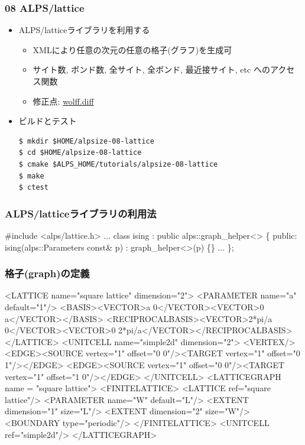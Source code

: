 \begin{frame}[fragile]
  \frametitle{08 ALPS/lattice}
  \begin{itemize}
    \item ALPS/latticeライブラリを利用する
      \begin{itemize}
        \item XMLにより任意の次元の任意の格子(グラフ)を生成可
        \item サイト数, ボンド数, 全サイト, 全ボンド, 最近接サイト, etc へのアクセス関数
        \item 修正点: \href{https://github.com/cmsi/alps-tutorial/blob/develop/alpsize/08-wolff.diff}{wolff.diff}
      \end{itemize}
    \item ビルドとテスト
\begin{lstlisting}
$ mkdir $HOME/alpsize-08-lattice
$ cd $HOME/alpsize-08-lattice
$ cmake $ALPS_HOME/tutorials/alpsize-08-lattice
$ make
$ ctest
\end{lstlisting}
  \end{itemize}
\end{frame}

\begin{frame}[fragile] \frametitle{ALPS/latticeライブラリの利用法}
\begin{semiverbatim}
#include <alps/lattice.h>
...
class ising : public alps::graph_helper<> \{
 public:
  ising(alps::Parameters const& p)
   : \alert{graph_helper<>(p)} \{\}
...
\};
\end{semiverbatim}

\end{frame}

\begin{frame}[fragile,shrink=30] \frametitle{格子(graph)の定義}
\begin{semiverbatim}
<LATTICE name="square lattice" dimension="2">
  <PARAMETER name="a" default="1"/>
  <BASIS><VECTOR>a 0</VECTOR><VECTOR>0 a</VECTOR></BASIS>
  <RECIPROCALBASIS><VECTOR>2*pi/a 0</VECTOR><VECTOR>0 2*pi/a</VECTOR></RECIPROCALBASIS>
</LATTICE>
<UNITCELL name="simple2d" dimension="2">
  <VERTEX/>
  <EDGE><SOURCE vertex="1" offset="0 0"/><TARGET vertex="1" offset="0 1"/></EDGE>
  <EDGE><SOURCE vertex="1" offset="0 0"/><TARGET vertex="1" offset="1 0"/></EDGE>
</UNITCELL>
<LATTICEGRAPH name = "square lattice">
  <FINITELATTICE>
    <LATTICE ref="square lattice"/>
    <PARAMETER name="W" default="L"/>
    <EXTENT dimension="1" size="L"/>
    <EXTENT dimension="2" size="W"/>
    <BOUNDARY type="periodic"/>
  </FINITELATTICE>
  <UNITCELL ref="simple2d"/>
</LATTICEGRAPH>
\end{semiverbatim}
\end{frame}

